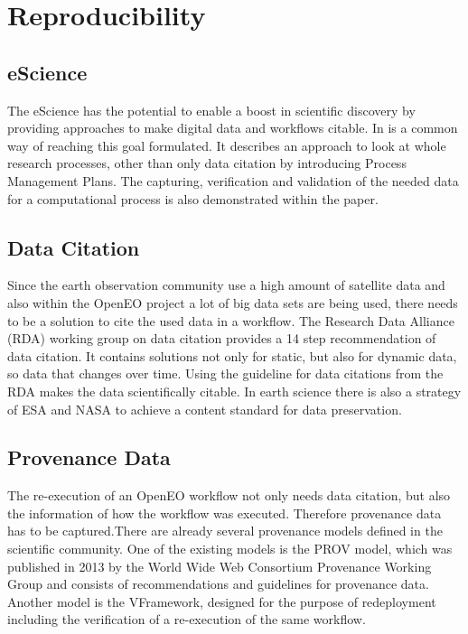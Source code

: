 \documentclass[draft,final]{vutinfth} %
\begin{document}
\section{Reproducibility}
\subsection{eScience}
The eScience has the potential to enable a boost in scientific discovery by providing approaches to make digital data and workflows citable. In \cite{Rauber2015RepeatabilityAR} is a common way of reaching this goal formulated. It describes an approach to look at whole research processes, other than only data citation by introducing Process Management Plans. The capturing, verification and validation of the needed data for a computational process is also demonstrated within the paper.\cite{Rauber2015RepeatabilityAR}

\subsection{Data Citation}
Since the earth observation community use a high amount of satellite data and also within the OpenEO project a lot of big data sets are being used, there needs to be a solution to cite the used data in a workflow. The Research Data Alliance (RDA) working group on data citation provides a 14 step recommendation of data citation. It contains solutions not only for static, but also for dynamic data, so data that changes over time. Using the guideline for data citations from the RDA makes the data scientifically citable. \cite{rauber2016identification} 
In earth science there is also a strategy of ESA and NASA to achieve a content standard for data preservation.\cite{6352411}

\subsection{Provenance Data}
The re-execution of an OpenEO workflow not only needs data citation, but also the information of how the workflow was executed. Therefore provenance data has to be captured.\cite{Roure11towardsthe}There are already several provenance models defined in the scientific community. One of the existing models is the PROV model, which was published in 2013 by the World Wide Web Consortium Provenance Working Group and consists of recommendations and guidelines for provenance data.\cite{MOREAU2015235} 
Another model is the VFramework, designed for the purpose of redeployment including the verification of a re-execution of the same workflow. \cite{DBLP:conf/ipres/MiksaPMSVBR13}
\end{document}
